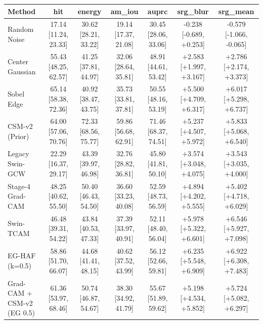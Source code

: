 \begin{tabular}{lcccccc}
\toprule
Method & hit & energy & am\_iou & auprc & srg\_blur & srg\_mean \\
\midrule
Random Noise & 17.14 [11.24, 23.33] & 30.62 [28.21, 33.22] & 19.14 [17.37, 21.08] & 30.45 [28.06, 33.06] & -0.238 [-0.689, +0.253] & -0.579 [-1.066, -0.065] \\
Center Gaussian & 55.43 [48.25, 62.57] & 41.25 [37.81, 44.97] & 32.06 [28.64, 35.81] & 48.91 [44.61, 53.42] & +2.583 [+1.997, +3.167] & +2.786 [+2.174, +3.373] \\
Sobel Edge & 65.14 [58.38, 72.36] & 40.92 [38.47, 43.75] & 35.73 [33.81, 37.81] & 50.55 [48.16, 53.19] & +5.500 [+4.709, +6.317] & +6.017 [+5.298, +6.737] \\
CSM-v2 (Prior) & 64.00 [57.06, 70.76] & 72.33 [68.56, 75.77] & 59.86 [56.68, 62.91] & 71.46 [68.37, 74.51] & +5.237 [+4.507, +5.972] & +5.833 [+5.068, +6.540] \\
Legacy Swin-GCW & 22.29 [16.37, 29.17] & 43.39 [39.97, 46.98] & 32.76 [28.82, 36.81] & 45.80 [41.81, 50.10] & +3.574 [+3.048, +4.075] & +3.543 [+3.035, +4.000] \\
Stage-4 Grad-CAM & 48.25 [40.62, 55.50] & 50.40 [46.43, 54.50] & 36.60 [33.23, 40.08] & 52.59 [48.73, 56.59] & +4.894 [+4.202, +5.555] & +5.402 [+4.718, +6.029] \\
Swin-TCAM & 46.48 [39.31, 54.22] & 43.84 [40.53, 47.33] & 37.39 [33.97, 40.91] & 52.11 [48.40, 56.04] & +5.978 [+5.322, +6.601] & +6.546 [+5.927, +7.098] \\
EG-HAF (k=0.5) & 58.86 [51.70, 66.07] & 44.68 [41.41, 48.15] & 40.62 [37.52, 43.99] & 56.12 [52.66, 59.81] & +6.235 [+5.548, +6.909] & +6.922 [+6.308, +7.483] \\
Grad-CAM + CSM-v2 (EG 0.5) & 61.36 [53.97, 68.46] & 50.74 [46.87, 54.67] & 38.30 [34.92, 41.79] & 55.67 [51.89, 59.62] & +5.198 [+4.534, +5.852] & +5.724 [+5.082, +6.297] \\
\bottomrule
\end{tabular}
